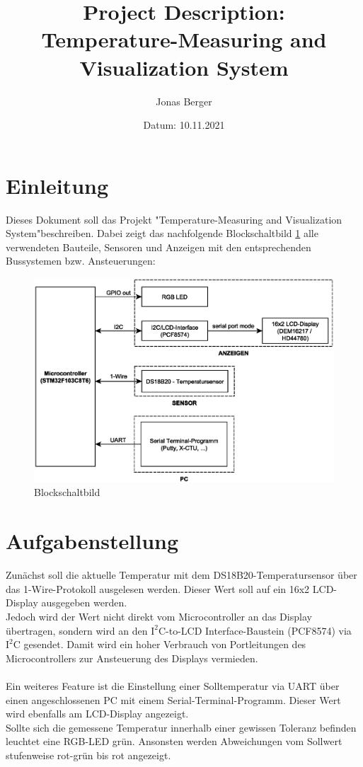 \documentclass[12pt,a4paper]{article}
\title{Project Description: \\ Temperature-Measuring and Visualization System}
\author{Jonas Berger}
\date{Datum: 10.11.2021}
\begin{document}
\maketitle

	\section{Einleitung}
	Dieses Dokument soll das Projekt "Temperature-Measuring and Visualization System"\space beschreiben. Dabei zeigt das nachfolgende Blockschaltbild \ref{figure:1} alle verwendeten Bauteile, Sensoren und Anzeigen mit den entsprechenden Bussystemen bzw. Ansteuerungen:
	\begin{figure}[H]
		\centering
		\includegraphics[width=0.9\linewidth]{Project_Mockup_V05}
		\caption{Blockschaltbild}
		\label{figure:1}
	\end{figure}
	\pagebreak
	
	\section{Aufgabenstellung}
	Zunächst soll die aktuelle Temperatur mit dem DS18B20-Temperatursensor über das 1-Wire-Protokoll ausgelesen werden. Dieser Wert soll auf ein 16x2 LCD-Display ausgegeben werden. \\
	Jedoch wird der Wert nicht direkt vom Microcontroller an das Display übertragen, sondern wird an den $\mathrm{I^{2}C}$-to-LCD Interface-Baustein (PCF8574) via $\mathrm{I^{2}C}$ gesendet. Damit wird ein hoher Verbrauch von Portleitungen des Microcontrollers zur Ansteuerung des Displays vermieden. \\
	\\ Ein weiteres Feature ist die Einstellung einer Solltemperatur via UART über einen angeschlossenen PC mit einem Serial-Terminal-Programm. Dieser Wert wird ebenfalls am LCD-Display angezeigt. \\
	Sollte sich die gemessene Temperatur innerhalb einer gewissen Toleranz befinden leuchtet eine RGB-LED grün. Ansonsten werden Abweichungen vom Sollwert stufenweise rot-grün bis rot angezeigt.
	
\end{document}
